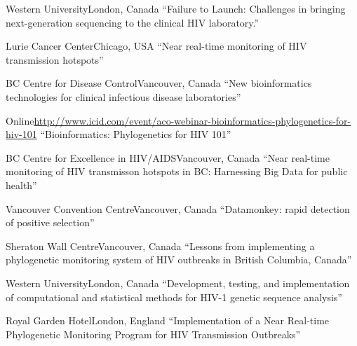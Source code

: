 {Western University}{London, Canada}
{``Failure to Launch: Challenges in bringing next-generation sequencing to the clinical HIV laboratory.''}

{}

{Lurie Cancer Center}{Chicago, USA}
{``Near real-time monitoring of HIV transmission hotspots''}

{BC Centre for Disease Control}{Vancouver, Canada}
{``New bioinformatics technologies for clinical infectious disease laboratories''}

{Online}{\url{http://www.icid.com/event/aco-webinar-bioinformatics-phylogenetics-for-hiv-101}}
{``Bioinformatics: Phylogenetics for HIV 101''}

{BC Centre for Excellence in HIV/AIDS}{Vancouver, Canada}
{``Near real-time monitoring of HIV transmisson hotspots in BC: Harnessing Big Data for public health''}

{Vancouver Convention Centre}{Vancouver, Canada}
{``Datamonkey: rapid detection of positive selection''}

{Sheraton Wall Centre}{Vancouver, Canada}
{``Lessons from implementing a phylogenetic monitoring system of HIV outbreaks in British Columbia, Canada''}

{Western University}{London, Canada}
{``Development, testing, and implementation of computational and statistical methods for HIV-1 genetic sequence analysis''}

{Royal Garden Hotel}{London, England}
{``Implementation of a Near Real-time Phylogenetic Monitoring Program for HIV Transmission Outbreaks''}

